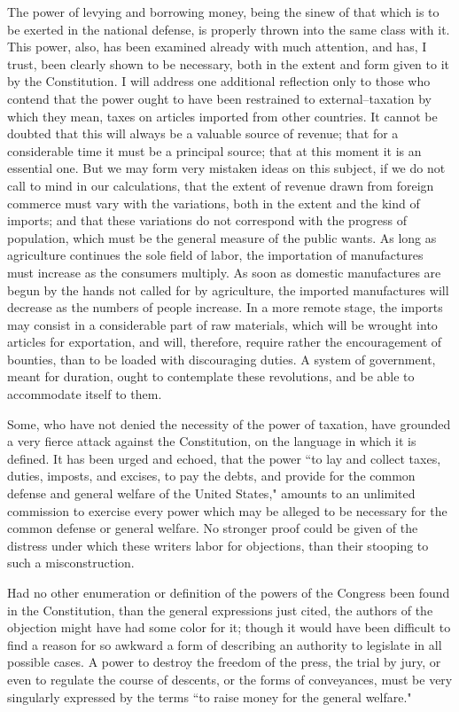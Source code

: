 The power of levying and borrowing money, being the sinew of that which is to be exerted in the national defense, is properly thrown into the same class with it. 
This power, also, has been examined already with much attention, and has, I trust, been clearly shown to be necessary, both in the extent and form given to it by the Constitution. 
I will address one additional reflection only to those who contend that the power ought to have been restrained to external--taxation by which they mean, taxes on articles imported from other countries. 
It cannot be doubted that this will always be a valuable source of revenue; that for a considerable time it must be a principal source; that at this moment it is an essential one. 
But we may form very mistaken ideas on this subject, if we do not call to mind in our calculations, that the extent of revenue drawn from foreign commerce must vary with the variations, both in the extent and the kind of imports; and that these variations do not correspond with the progress of population, which must be the general measure of the public wants. 
As long as agriculture continues the sole field of labor, the importation of manufactures must increase as the consumers multiply. 
As soon as domestic manufactures are begun by the hands not called for by agriculture, the imported manufactures will decrease as the numbers of people increase. 
In a more remote stage, the imports may consist in a considerable part of raw materials, which will be wrought into articles for exportation, and will, therefore, require rather the encouragement of bounties, than to be loaded with discouraging duties. 
A system of government, meant for duration, ought to contemplate these revolutions, and be able to accommodate itself to them.

Some, who have not denied the necessity of the power of taxation, have grounded a very fierce attack against the Constitution, on the language in which it is defined. 
It has been urged and echoed, that the power ``to lay and collect taxes, duties, imposts, and excises, to pay the debts, and provide for the common defense and general welfare of the United States," amounts to an unlimited commission to exercise every power which may be alleged to be necessary for the common defense or general welfare. 
No stronger proof could be given of the distress under which these writers labor for objections, than their stooping to such a misconstruction.

Had no other enumeration or definition of the powers of the Congress been found in the Constitution, than the general expressions just cited, the authors of the objection might have had some color for it; though it would have been difficult to find a reason for so awkward a form of describing an authority to legislate in all possible cases. 
A power to destroy the freedom of the press, the trial by jury, or even to regulate the course of descents, or the forms of conveyances, must be very singularly expressed by the terms ``to raise money for the general welfare."

